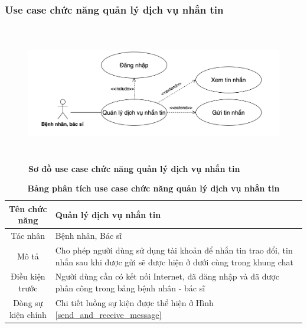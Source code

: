 \subsubsection{Use case chức năng quản lý dịch vụ nhắn tin}
  \begin{figure}[H]
    \centering
    \includegraphics[width=15cm,height=6cm]{Images/use_case/use_case_send_receive_message.png}
    \caption[Sơ đồ use case chức năng quản lý dịch vụ nhắn tin]{\bfseries \fontsize{12pt}{0pt}
    \selectfont Sơ đồ use case chức năng quản lý dịch vụ nhắn tin}
    \label{use_case_send_receive_message} %
  \end{figure}

  \begin{table}[H]
    \caption{\bfseries \fontsize{12pt}{0pt}\selectfont Bảng phân tích use case chức năng quản lý dịch vụ nhắn tin}
    \centering
    \begin{tabularx}{0.9\textwidth}{|c|X|}
      \hline
      \textbf{Tên chức năng} & \textbf{Quản lý dịch vụ nhắn tin} \\
      \hline
      Tác nhân & Bệnh nhân, Bác sĩ \\
      \hline
      Mô tả & Cho phép người dùng sử dụng tài khoản để nhắn tin trao đổi, tin nhắn sau khi được gửi sẽ được
      hiện ở dưới cùng trong khung chat \\
      \hline
      Điều kiện trước & Người dùng cần có kết nối Internet, đã đăng nhập và đã được phân công trong bảng bệnh nhân - bác sĩ \\
      \hline
      Dòng sự kiện chính & 
        Chi tiết luồng sự kiện được thể hiện ở Hình \ref{send_and_receive_message}\\
      \hline
    \end{tabularx}
  \end{table}

